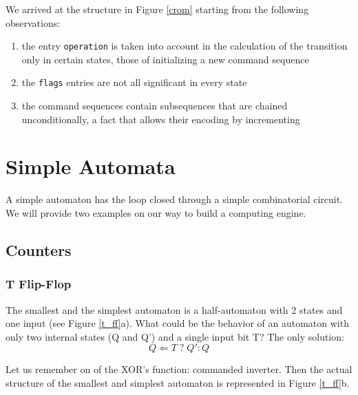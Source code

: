 We arrived at the structure in Figure \ref{crom} starting from the following observations:
\begin{enumerate}
\item the entry {\tt operation} is taken into account in the calculation of the transition only in certain states, those of initializing a new command sequence

\item the {\tt flags} entries are not all significant in every state

\item the command sequences contain subsequences that are chained unconditionally, a fact that allows their encoding by incrementing
\end{enumerate}


\section{Simple Automata}

A simple automaton has the loop closed through a simple combinatorial circuit. We will provide two examples on our way to build a computing engine.

\subsection{Counters}

\subsubsection{T Flip-Flop}

The smallest and the simplest automaton is a half-automaton with 2 states and one input (see Figure \ref{t_ff}a). What could be the behavior of an automaton with only two internal states (Q and Q') and a single input bit T? The only solution:
$$Q \Leftarrow T \;? \; Q' : Q$$


Let us remember on of the XOR's function: commanded inverter. Then the actual structure of the smallest and simplest automaton is represented in Figure \ref{t_ff}b.

